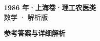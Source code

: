 \documentclass[zihao=-4, a4paper]{ctexart}
\begin{document}
\begin{center}
  {\Large\bfseries 1986 年·上海卷·理工农医类}\\[4pt]
  {\large 数学 · 解析版}
\end{center}
\medskip
{}

\clearpage
{}
\begin{center}{\Large\bfseries 参考答案与详细解析}\end{center}
\medskip

\end{document}
